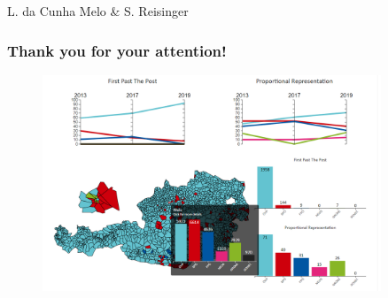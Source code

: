 \documentclass{beamer}
\begin{document}
\begin{frame}
\centerline{L. da Cunha Melo \& S. Reisinger}
\frametitle{Thank you for your attention!}
\begin{figure}
    \centering
    \includegraphics[width=0.9\textwidth]{images/screenshot.png}
\end{figure}

\end{frame}

\end{document}
